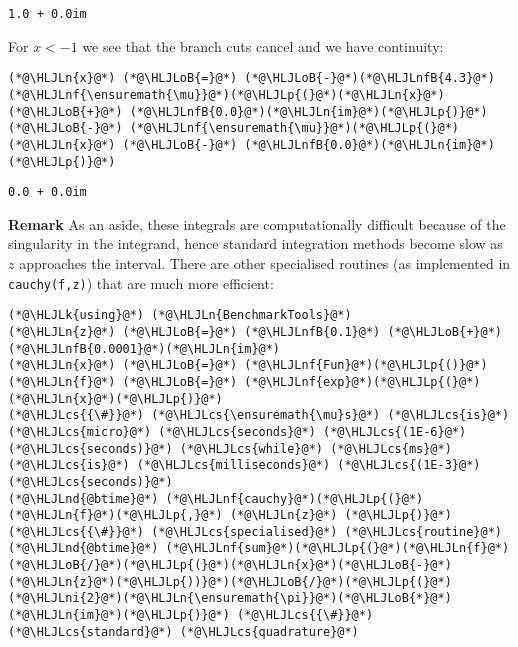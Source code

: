 \documentclass[12pt,landscape]{article}
\newcommand{\HLJLk}[1]{\textcolor[RGB]{148,91,176}{\textbf{#1}}}
\newcommand{\HLJLn}[1]{#1}
\newcommand{\HLJLnd}[1]{\textcolor[RGB]{214,102,97}{#1}}
\newcommand{\HLJLnf}[1]{\textcolor[RGB]{66,102,213}{#1}}
\newcommand{\HLJLnfB}[1]{\textcolor[RGB]{59,151,46}{#1}}
\newcommand{\HLJLni}[1]{\textcolor[RGB]{59,151,46}{#1}}
\newcommand{\HLJLoB}[1]{\textcolor[RGB]{102,102,102}{\textbf{#1}}}
\newcommand{\HLJLp}[1]{#1}
\newcommand{\HLJLcs}[1]{\textcolor[RGB]{153,153,119}{\textit{#1}}}
\begin{document}
{\begin{lstlisting}
1.0 + 0.0im
\end{lstlisting}


For $x < -1$ we see that the branch cuts cancel and we have continuity:


\begin{lstlisting}
(*@\HLJLn{x}@*) (*@\HLJLoB{=}@*) (*@\HLJLoB{-}@*)(*@\HLJLnfB{4.3}@*)
(*@\HLJLnf{\ensuremath{\mu}}@*)(*@\HLJLp{(}@*)(*@\HLJLn{x}@*) (*@\HLJLoB{+}@*) (*@\HLJLnfB{0.0}@*)(*@\HLJLn{im}@*)(*@\HLJLp{)}@*) (*@\HLJLoB{-}@*) (*@\HLJLnf{\ensuremath{\mu}}@*)(*@\HLJLp{(}@*)(*@\HLJLn{x}@*) (*@\HLJLoB{-}@*) (*@\HLJLnfB{0.0}@*)(*@\HLJLn{im}@*)(*@\HLJLp{)}@*)
\end{lstlisting}

\begin{lstlisting}
0.0 + 0.0im
\end{lstlisting}


\textbf{Remark} As an aside, these integrals are computationally difficult because of the singularity in the integrand, hence standard integration methods become slow as $z$ approaches the interval. There are other specialised routines (as implemented in \texttt{cauchy(f,z)}) that are much more efficient:


\begin{lstlisting}
(*@\HLJLk{using}@*) (*@\HLJLn{BenchmarkTools}@*)
(*@\HLJLn{z}@*) (*@\HLJLoB{=}@*) (*@\HLJLnfB{0.1}@*) (*@\HLJLoB{+}@*)(*@\HLJLnfB{0.0001}@*)(*@\HLJLn{im}@*)
(*@\HLJLn{x}@*) (*@\HLJLoB{=}@*) (*@\HLJLnf{Fun}@*)(*@\HLJLp{()}@*)
(*@\HLJLn{f}@*) (*@\HLJLoB{=}@*) (*@\HLJLnf{exp}@*)(*@\HLJLp{(}@*)(*@\HLJLn{x}@*)(*@\HLJLp{)}@*)
(*@\HLJLcs{{\#}}@*) (*@\HLJLcs{\ensuremath{\mu}s}@*) (*@\HLJLcs{is}@*) (*@\HLJLcs{micro}@*) (*@\HLJLcs{seconds}@*) (*@\HLJLcs{(1E-6}@*) (*@\HLJLcs{seconds)}@*) (*@\HLJLcs{while}@*) (*@\HLJLcs{ms}@*) (*@\HLJLcs{is}@*) (*@\HLJLcs{milliseconds}@*) (*@\HLJLcs{(1E-3}@*) (*@\HLJLcs{seconds)}@*)
(*@\HLJLnd{@btime}@*) (*@\HLJLnf{cauchy}@*)(*@\HLJLp{(}@*)(*@\HLJLn{f}@*)(*@\HLJLp{,}@*) (*@\HLJLn{z}@*) (*@\HLJLp{)}@*) (*@\HLJLcs{{\#}}@*) (*@\HLJLcs{specialised}@*) (*@\HLJLcs{routine}@*)
(*@\HLJLnd{@btime}@*) (*@\HLJLnf{sum}@*)(*@\HLJLp{(}@*)(*@\HLJLn{f}@*)(*@\HLJLoB{/}@*)(*@\HLJLp{(}@*)(*@\HLJLn{x}@*)(*@\HLJLoB{-}@*)(*@\HLJLn{z}@*)(*@\HLJLp{))}@*)(*@\HLJLoB{/}@*)(*@\HLJLp{(}@*)(*@\HLJLni{2}@*)(*@\HLJLn{\ensuremath{\pi}}@*)(*@\HLJLoB{*}@*)(*@\HLJLn{im}@*)(*@\HLJLp{)}@*) (*@\HLJLcs{{\#}}@*) (*@\HLJLcs{standard}@*) (*@\HLJLcs{quadrature}@*)
\end{lstlisting}

}
\end{document}
